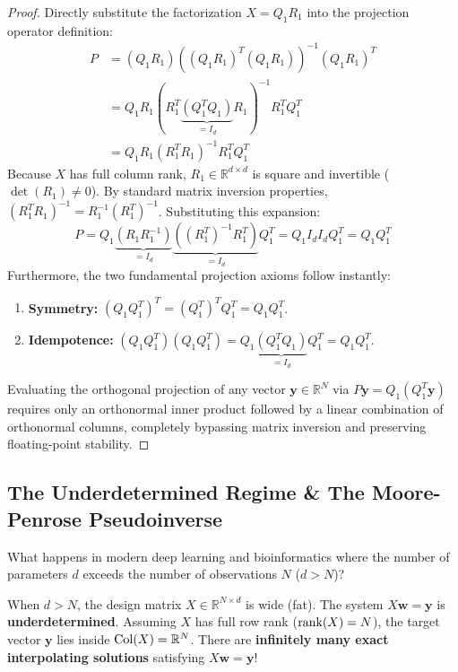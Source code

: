 \begin{proof}
Directly substitute the factorization $X = Q_1 R_1$ into the projection operator definition:
\begin{align}
P &= (Q_1 R_1) \left( (Q_1 R_1)^T (Q_1 R_1) \right)^{-1} (Q_1 R_1)^T \\
&= Q_1 R_1 \left( R_1^T \underbrace{(Q_1^T Q_1)}_{= I_d} R_1 \right)^{-1} R_1^T Q_1^T \\
&= Q_1 R_1 \left( R_1^T R_1 \right)^{-1} R_1^T Q_1^T
\end{align}
Because $X$ has full column rank, $R_1 \in \mathbb{R}^{d \times d}$ is square and invertible ($\det(R_1) \ne 0$). By standard matrix inversion properties, $(R_1^T R_1)^{-1} = R_1^{-1} (R_1^T)^{-1}$. Substituting this expansion:
\begin{equation}
P = Q_1 \underbrace{(R_1 R_1^{-1})}_{= I_d} \underbrace{\left( (R_1^T)^{-1} R_1^T \right)}_{= I_d} Q_1^T = Q_1 I_d I_d Q_1^T = Q_1 Q_1^T
\end{equation}
Furthermore, the two fundamental projection axioms follow instantly:
\begin{enumerate}
    \item \textbf{Symmetry:} $(Q_1 Q_1^T)^T = (Q_1^T)^T Q_1^T = Q_1 Q_1^T$.
    \item \textbf{Idempotence:} $(Q_1 Q_1^T)(Q_1 Q_1^T) = Q_1 \underbrace{(Q_1^T Q_1)}_{= I_d} Q_1^T = Q_1 Q_1^T$.
\end{enumerate}
Evaluating the orthogonal projection of any vector $\mathbf{y} \in \mathbb{R}^N$ via $P\mathbf{y} = Q_1 (Q_1^T \mathbf{y})$ requires only an orthonormal inner product followed by a linear combination of orthonormal columns, completely bypassing matrix inversion and preserving floating-point stability.
\end{proof}

\subsection{The Underdetermined Regime \& The Moore-Penrose Pseudoinverse}
What happens in modern deep learning and bioinformatics where the number of parameters $d$ exceeds the number of observations $N$ ($d > N$)?

When $d > N$, the design matrix $X \in \mathbb{R}^{N \times d}$ is wide (fat). The system $X\mathbf{w} = \mathbf{y}$ is \textbf{underdetermined}. Assuming $X$ has full row rank ($\operatorname{rank}(X) = N$), the target vector $\mathbf{y}$ lies inside $\operatorname{Col}(X) = \mathbb{R}^N$. There are \textbf{infinitely many exact interpolating solutions} satisfying $X\mathbf{w} = \mathbf{y}$!


